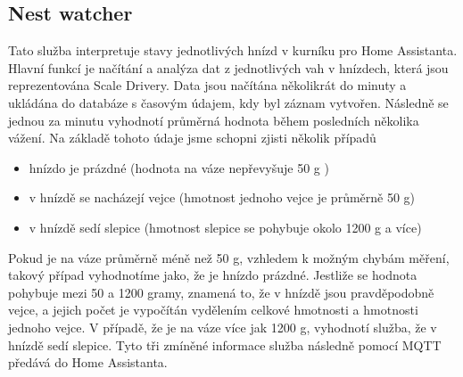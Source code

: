 
\subsection{Nest watcher}\label{subsec:nest-watcher}
Tato služba interpretuje stavy jednotlivých hnízd v kurníku pro Home Assistanta.
Hlavní funkcí je načítání a analýza dat z jednotlivých vah v hnízdech, která jsou reprezentována Scale Drivery.\newline
Data jsou načítána několikrát do minuty a ukládána do databáze s časovým údajem, kdy byl záznam vytvořen.
Následně se jednou za minutu vyhodnotí průměrná hodnota během posledních několika vážení.
Na základě tohoto údaje jsme schopni zjisti několik případů
\begin{itemize}
    \item hnízdo je prázdné (hodnota na váze nepřevyšuje 50 g )
    \item v hnízdě se nacházejí vejce (hmotnost jednoho vejce je průměrně 50 g)
    \item v hnízdě sedí slepice (hmotnost slepice se pohybuje okolo 1200 g a více)
\end{itemize}
Pokud je na váze průměrně méně než 50 g, vzhledem k možným chybám měření, takový případ vyhodnotíme jako, že je hnízdo prázdné.
Jestliže se hodnota pohybuje mezi 50 a 1200 gramy, znamená to, že v hnízdě jsou pravděpodobně vejce, a jejich počet je vypočítán vydělením celkové hmotnosti a hmotnosti jednoho vejce.
V případě, že je na váze více jak 1200 g, vyhodnotí služba, že v hnízdě sedí slepice.
Tyto tři zmíněné informace služba následně pomocí MQTT předává do Home Assistanta.